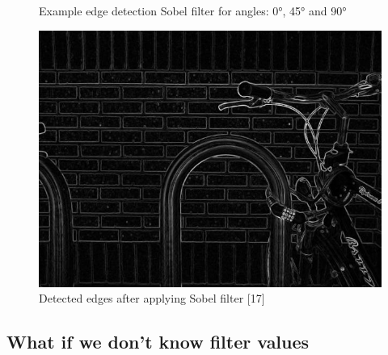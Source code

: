 \documentclass[letterpaper, 10 pt, conference]{ieeeconf}  %
\begin{document}
   \begin{figure}[!ht]
      \centering
      
      \caption{Example edge detection Sobel filter for angles: \ang{0}, \ang{45} and \ang{90}}
      \label{figurelabel}
   \end{figure}
   
   
      \begin{figure}[!ht]
      \centering
      \includegraphics[scale=0.35]{Pictures/Bikesgraysobel.jpg}
      \caption{Detected edges after applying Sobel filter [17]}
      \label{figurelabel}
   \end{figure}



\subsection{What if we don't know filter values}
\end{document}
